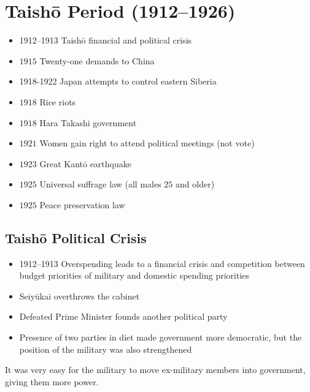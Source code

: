 \documentclass[class=article, crop=false]{standalone}
\begin{document}
  \section{Taish\=o Period (1912--1926)}
  \begin{itemize}
    \item 1912--1913 Taish\=o financial and political crisis
    \item $1915$ Twenty-one demands to China
    \item 1918-1922 Japan attempts to control eastern Siberia
    \item $1918$ Rice riots
    \item $1918$ Hara Takashi government
    \item $1921$ Women gain right to attend political meetings (not vote)
    \item $1923$ Great Kant\=o earthquake
    \item $1925$ Universal suffrage law (all males $25$ and older)
    \item $1925$ Peace preservation law
  \end{itemize}
  \subsection{Taish\=o Political Crisis}
  \begin{itemize}
    \item 1912--1913 Overspending leads to a financial crisis and competition between budget priorities of military and domestic spending priorities
    \item Seiy\=ukai overthrows the cabinet
    \item Defeated Prime Minister founds another political party
    \item Presence of two parties in diet made government more democratic, but the position of the military was also strengthened
  \end{itemize}
  \begin{note}{}
    It was very easy for the military to move ex-military members into government, giving them more power.
  \end{note}
\end{document}
